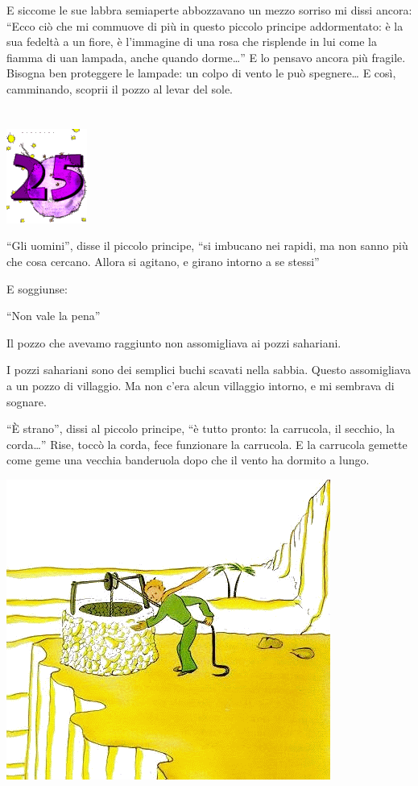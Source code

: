 \documentclass[11pt]{scrbook}
\begin{document}
E siccome le sue labbra semiaperte abbozzavano un mezzo sorriso mi dissi ancora: ``Ecco ciò che mi commuove di più in questo piccolo principe addormentato: è la sua fedeltà a un fiore, è l'immagine di una rosa che risplende in lui come la fiamma di uan lampada, anche quando dorme\ldots{}'' E lo pensavo ancora più fragile. Bisogna ben proteggere le lampade: un colpo di vento le può spegnere\ldots{} E così, camminando, scoprii il pozzo al levar del sole.

\chapter{}
\begin{center}
\includegraphics{img/chapter25}
\end{center}

``Gli uomini'', disse il piccolo principe, ``si imbucano nei rapidi, ma non sanno più che cosa cercano. Allora si agitano, e girano intorno a se stessi''

E soggiunse:

``Non vale la pena''

Il pozzo che avevamo raggiunto non assomigliava ai pozzi sahariani.

I pozzi sahariani sono dei semplici buchi scavati nella sabbia. Questo assomigliava a un pozzo di villaggio. Ma non c'era alcun villaggio intorno, e mi sembrava di sognare.

``È strano'', dissi al piccolo principe, ``è tutto pronto: la carrucola, il secchio, la corda\ldots{}'' Rise, toccò la corda, fece funzionare la carrucola. E la carrucola gemette come geme una vecchia banderuola dopo che il vento ha dormito a lungo.

\begin{center}
\includegraphics{img/25a}
\end{center}
\end{document}
